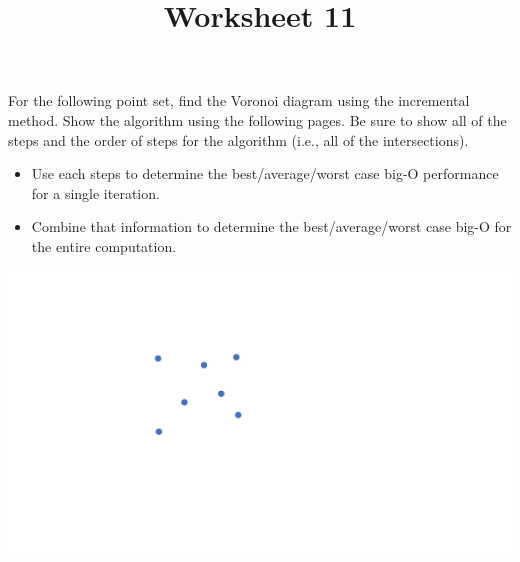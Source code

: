 \documentclass[a4paper,12pt]{article}
\title{Worksheet 11}
\begin{document}
\maketitle

\worksheetGroundRules

\worksheetSubmission

\assignmentInstructions

For the following point set, find the Voronoi diagram using the incremental method. Show the algorithm using the following pages. Be sure to show all of the steps and the order of steps for the algorithm (i.e., all of the intersections).

\begin{itemize}

\item Use each steps to determine the best/average/worst case big-O performance for a single iteration. 
\item Combine that information to determine the best/average/worst case big-O for the entire computation.

\end{itemize}


\begin{center}
\includegraphics[width=0.65\linewidth]{../images/voronoi7.pdf}
\end{center}




\newpage
\end{document}
